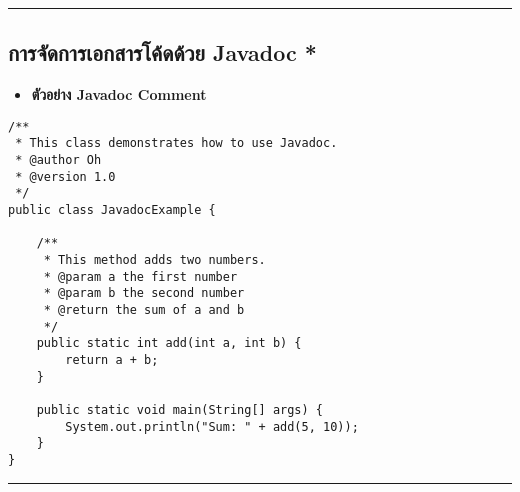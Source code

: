 \documentclass[11pt]{article}
\begin{document}
\noindent\rule{\textwidth}{0.5pt}
\subsection{การจัดการเอกสารโค้ดด้วย Javadoc *}
\label{sec:org48ee709}
\begin{itemize}
\item \textbf{ตัวอย่าง Javadoc Comment}
\end{itemize}
\begin{verbatim}
/**
 * This class demonstrates how to use Javadoc.
 * @author Oh
 * @version 1.0
 */
public class JavadocExample {

    /**
     * This method adds two numbers.
     * @param a the first number
     * @param b the second number
     * @return the sum of a and b
     */
    public static int add(int a, int b) {
        return a + b;
    }

    public static void main(String[] args) {
        System.out.println("Sum: " + add(5, 10));
    }
}
\end{verbatim}

\noindent\rule{\textwidth}{0.5pt}
\end{document}
